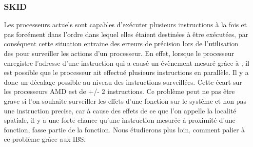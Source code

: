 					\subsubsection{SKID}
						Les processeurs actuels sont capables d'exécuter plusieurs instructions à la fois et pas forcément dans l'ordre dans lequel elles étaient destinées à être exécutées, par conséquent cette situation entraine des erreurs de précision lors de l'utilisation des \PMC pour surveiller les actions d'un processeur. En effet, lorsque le processeur enregistre l'adresse d'une instruction qui a causé un évènement mesuré grâce à \PMC, il est possible que le processeur ait effectué plusieurs instructions en parallèle. Il y a donc un décalage possible au niveau des instructions surveillées. Cette écart sur les processeurs AMD est de +/- 2 instructions. Ce problème peut ne pas être grave si l'on souhaite surveiller les effets d'une fonction sur le système et non pas une instruction precise, car à cause des effets de ce que l'on appelle la localité spatiale, il y a une forte chance qu'une instruction mesurée à proximité d'une fonction, fasse partie de la fonction. Nous étudierons plus loin, comment palier à ce problème grâce aux IBS.
